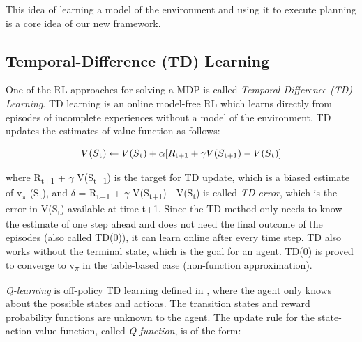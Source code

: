 \documentclass[11pt,twoside]{report}
\theoremstyle{plain}
\theoremstyle{definition}
\begin{document}
This idea of learning a model of the environment and using it to execute planning is a core idea of our new framework. 

\subsection{Temporal-Difference (TD) Learning}
\label{td_learning_section}

One of the RL approaches for solving a MDP is called \textit{Temporal-Difference (TD) Learning}.
TD learning is an online model-free RL which learns directly from episodes of incomplete experiences without a model of the environment.
TD updates the estimates of value function as follows:

\begin{equation}
\centering
V(S\textsubscript{t}) \leftarrow V(S\textsubscript{t}) + \alpha[R\textsubscript{t+1} + \gamma V(S\textsubscript{t+1}) - V(S\textsubscript{t})]
\end{equation}

where R\textsubscript{t+1} + $\gamma$ V(S\textsubscript{t+1}) is the target for TD update, which is a biased estimate of v\textsubscript{$\pi$} (S\textsubscript{t}), and $\delta$ = R\textsubscript{t+1} + $\gamma$ V(S\textsubscript{t+1}) - V(S\textsubscript{t}) is called \textit{TD error}, which is the error in V(S\textsubscript{t}) available at time t+1.
Since the TD method only needs to know the estimate of one step ahead and does not need the final outcome of the episodes (also called TD(0)), it can learn online after every time step. TD also works without the terminal state, which is the goal for an agent.
TD(0) is proved to converge to v\textsubscript{$\pi$} in the table-based case (non-function approximation).


\textit{Q-learning} is off-policy TD learning defined in \cite{Watkins}, where the agent only knows about the possible states and actions. 
The transition states and reward probability functions are unknown to the agent.
The update rule for the state-action value function, called \textit{Q function}, is of the form:
\end{document}
